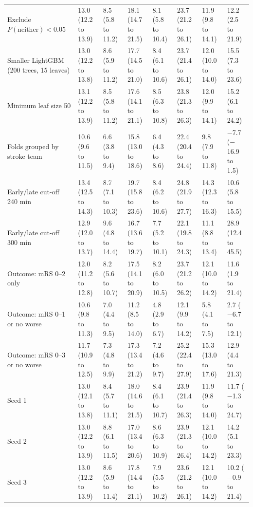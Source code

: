 \begin{landscape}
{\begin{longtable}[]{@{}llllllll@{}}
Exclude $P(\mathrm{neither}) < 0.05$ & 13.0 (12.2 to 13.9) & 8.5 (5.8 to 11.2) & 18.1 (14.7 to 21.5) & 8.1 (5.8 to 10.4) & 23.7 (21.2 to 26.1) & 11.9 (9.8 to 14.1) & 12.2 (2.5 to 21.9) \\
Smaller LightGBM (200 trees, 15 leaves) & 13.0 (12.2 to 13.8) & 8.6 (5.9 to 11.2) & 17.7 (14.5 to 21.0) & 8.4 (6.1 to 10.6) & 23.7 (21.4 to 26.1) & 12.0 (10.0 to 14.0) & 15.5 (7.3 to 23.6) \\
Minimum leaf size 50 & 13.1 (12.2 to 13.9) & 8.5 (5.8 to 11.2) & 17.6 (14.1 to 21.1) & 8.5 (6.3 to 10.8) & 23.8 (21.3 to 26.3) & 12.0 (9.9 to 14.1) & 15.2 (6.1 to 24.2) \\
Folds grouped by stroke team & 10.6 (9.6 to 11.5) & 6.6 (3.8 to 9.4) & 15.8 (13.0 to 18.6) & 6.4 (4.3 to 8.6) & 22.4 (20.4 to 24.4) & 9.8 (7.9 to 11.8) & $-$7.7 ($-$16.9 to 1.5) \\
Early/late cut-off 240 min & 13.4 (12.5 to 14.3) & 8.7 (7.1 to 10.3) & 19.7 (15.8 to 23.6) & 8.4 (6.2 to 10.6) & 24.8 (21.9 to 27.7) & 14.3 (12.3 to 16.3) & 10.6 (5.8 to 15.5) \\
Early/late cut-off 300 min & 12.9 (12.0 to 13.7) & 9.6 (4.8 to 14.4) & 16.7 (13.6 to 19.7) & 7.7 (5.2 to 10.1) & 22.1 (19.8 to 24.3) & 11.1 (8.8 to 13.4) & 28.9 (12.4 to 45.5) \\
Outcome: mRS 0--2 only & 12.0 (11.2 to 12.8) & 8.2 (5.6 to 10.7) & 17.5 (14.1 to 20.9) & 8.2 (6.0 to 10.5) & 23.7 (21.2 to 26.2) & 12.1 (10.0 to 14.2) & 11.6 (1.9 to 21.4) \\
Outcome: mRS 0--1 or no worse & 10.6 (9.8 to 11.3) & 7.0 (4.4 to 9.5) & 11.2 (8.5 to 14.0) & 4.8 (2.9 to 6.7) & 12.1 (9.9 to 14.2) & 5.8 (4.1 to 7.5) & 2.7 ($-$6.7 to 12.1) \\
Outcome: mRS 0--3 or no worse & 11.7 (10.9 to 12.5) & 7.3 (4.8 to 9.9) & 17.3 (13.4 to 21.2) & 7.2 (4.6 to 9.7) & 25.2 (22.4 to 27.9) & 15.3 (13.0 to 17.6) & 12.9 (4.4 to 21.3) \\
Seed 1 & 13.0 (12.1 to 13.8) & 8.4 (5.7 to 11.1) & 18.0 (14.6 to 21.5) & 8.4 (6.1 to 10.7) & 23.9 (21.4 to 26.3) & 11.9 (9.8 to 14.0) & 11.7 ($-$1.3 to 24.7) \\
Seed 2 & 13.0 (12.2 to 13.9) & 8.8 (6.1 to 11.5) & 17.0 (13.4 to 20.6) & 8.6 (6.3 to 10.9) & 23.9 (21.3 to 26.4) & 12.1 (10.0 to 14.2) & 14.2 (5.1 to 23.3) \\
Seed 3 & 13.0 (12.2 to 13.9) & 8.6 (5.9 to 11.4) & 17.8 (14.4 to 21.1) & 7.9 (5.5 to 10.2) & 23.6 (21.2 to 26.1) & 12.1 (10.0 to 14.2) & 10.2 ($-$0.9 to 21.4) \\
\end{longtable}
}
\end{landscape}

